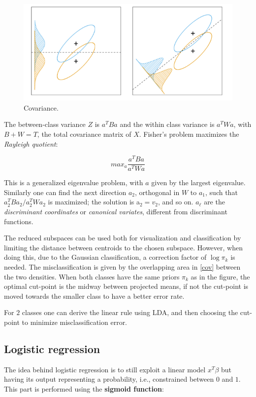 \documentclass[12pt, letterpaper]{article}
\theoremstyle{definition}
\let\tb\textbf
\begin{document}
\begin{figure}
\centering
\includegraphics[scale=0.4]{img/cov}
\caption{Covariance.}
\label{cov}
\end{figure}

The between-class variance $Z$ is $a^TBa$ and the within class variance is $a^TWa$, with $B+W=T$, the total covariance matrix of $X$.
Fisher's problem maximizes the \textit{Rayleigh quotient}:

\begin{equation}
max_{a} \frac{a^TBa}{a^TWa}
\end{equation}

This is a generalized eigenvalue problem, with $a$ given by the largest eigenvalue. Similarly one can find the next direction $a_2$, orthogonal in $W$ to $a_1$, such that $a^T_2 Ba_2/a^T_2 Wa_2$ is maximized; the solution is a$_2 = v_2$, and so on. $a_\ell$ are the \textit{discriminant coordinates} or \textit{canonical variates}, different from discriminant functions.

The reduced subspaces can be used both for visualization and classification by limiting the distance between centroids to the chosen subspace. However, when doing this, due to the Gaussian classification, a correction factor of $\log \pi_k$ is needed. The misclassification is given by the overlapping area in \autoref{cov} between the two densities. When both classes have the same priors $\pi_k$ as in the figure, the optimal cut-point is the midway between projected means, if not the cut-point is moved towards the smaller class to have a better error rate.

For $2$ classes one can derive the linear rule using LDA, and then choosing the cut-point to minimize misclassification error.

\subsection{Logistic regression}
\label{LogReg}
The idea behind logistic regression is to still exploit a linear model $x^T\beta$ but having its output representing a probability, i.e., constrained between $0$ and $1$. This part is performed using the \tb{sigmoid function}:
\end{document}
